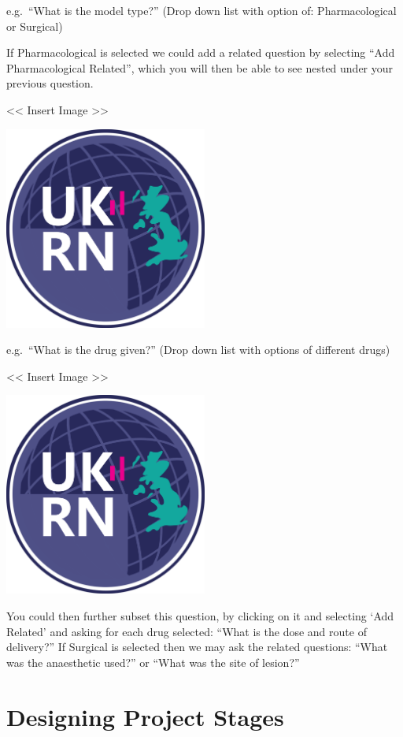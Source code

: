 \documentclass[
]{book}
\begin{document}
e.g.~``What is the model type?''
(Drop down list with option of: Pharmacological or Surgical)

If Pharmacological is selected we could add a related question by selecting ``Add Pharmacological Related'', which you will then be able to see nested under your previous question.

\textless{}\textless{} Insert Image \textgreater{}\textgreater{}

\includegraphics[width=0.5\textwidth,height=0.5\textheight]{figs/evidence-triangle.png}

e.g.~``What is the drug given?''
(Drop down list with options of different drugs)

\textless{}\textless{} Insert Image \textgreater{}\textgreater{}

\includegraphics[width=0.5\textwidth,height=0.5\textheight]{figs/evidence-triangle.png}

You could then further subset this question, by clicking on it and selecting `Add Related' and asking for each drug selected: ``What is the dose and route of delivery?''
If Surgical is selected then we may ask the related questions: ``What was the anaesthetic used?'' or ``What was the site of lesion?''

\hypertarget{stages}{%
\chapter{Designing Project Stages}\label{stages}}
\end{document}
